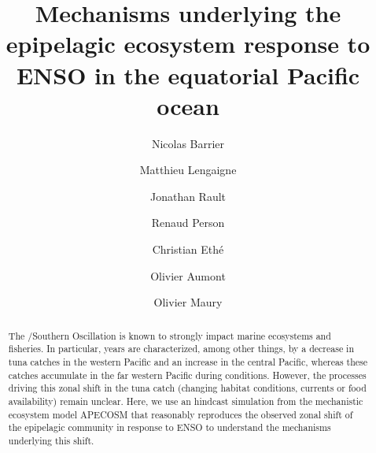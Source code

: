 \documentclass[review, 12pt]{elsarticle}
\begin{document}
\begin{frontmatter}

\title{Mechanisms underlying the epipelagic ecosystem response to ENSO in the equatorial Pacific ocean}

\author[mymainaddress]{Nicolas Barrier}

\author[mymainaddress]{Matthieu Lengaigne}
\author[mymainaddress]{Jonathan Rault}
\author[renaud]{Renaud Person}
\author[chris]{Christian Eth\'{e}}
\author[renaud]{Olivier Aumont}
\author[mymainaddress]{Olivier Maury}


\address[mymainaddress]{MARBEC, Univ. Montpellier, CNRS, Ifremer, IRD, Sète, France}
\address[renaud]{LOCEAN, IRD}
\address[chris]{IPSL, CNRS}

\begin{abstract}

The \nino{}/Southern Oscillation is known to strongly impact marine ecosystems and fisheries. In particular, \nino{} years are characterized, among other things, by a decrease in tuna catches in the western Pacific and an increase in the central Pacific, whereas these catches accumulate in the far western Pacific during \nina{} conditions. However, the processes driving this zonal shift in the tuna catch (changing habitat conditions, currents or food availability) remain unclear. Here, we use an hindcast simulation from the mechanistic ecosystem model APECOSM that reasonably reproduces the observed zonal shift of the epipelagic community in response to ENSO to understand the mechanisms underlying this shift.



\end{abstract}
\end{frontmatter}
\end{document}
